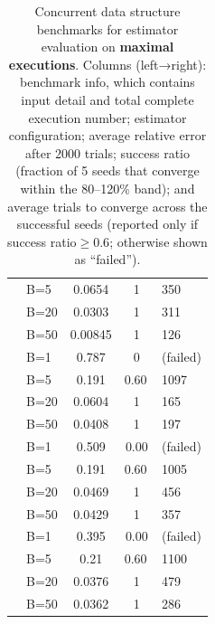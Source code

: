 \begin{table}[t]
\begin{tabular}{@{} l l S[scientific-notation=true] S[table-format=1.2] l @{}}
    &  B=5            & \num{0.0654} & {1} & \num{350} \\
    &  B=20           & \num{0.0303} & {1} & \num{311} \\
    &  B=50           & \num{0.00845} & {1} & \num{126} \\ 
    \midrule
         &  B=1              & \num{0.787} & \num{0} & (failed) \\
    &  B=5             & \num{0.191} & {\num{0.60}\,}  & \num{1097} \\
    &  B=20            & \num{0.0604} & {1} & \num{165} \\
    &  B=50            & \num{0.0408} & {1} & \num{197}  \\ 
    \midrule
{} & B=1 & \num{0.509} & \num{0.00} & (failed) \\
    &B=5      & \num{0.191} & {\num{0.60}\,}  & \num{1005} \\
    &  B=20     & \num{0.0469} & {1} & \num{456} \\
    & B=50     & \num{0.0429} & {1} & \num{357} \\
    \midrule
    
 &   B=1 & \num{0.395} & \num{0.00} & (failed) \\
    &  B=5      & \num{0.21} & {\num{0.60}\,} & \num{1100} \\
    &  B=20     & \num{0.0376} & {1} & \num{479} \\
    &  B=50     & \num{0.0362} & {1} & \num{286} \\
    \bottomrule



  \end{tabular}

  \vspace{0.1in}
  \caption{Concurrent data structure benchmarks for estimator evaluation on  \textbf{maximal executions}. Columns (left→right): benchmark info, which contains input detail and total complete execution number; estimator configuration; average relative error after 2000 trials; success ratio (fraction of 5 seeds that converge within the 80–120\% band); and average trials to converge across the successful seeds (reported only if success ratio$\geq 0.6$; otherwise shown as “failed”). }
    \label{tab:convergence}

\end{table}

